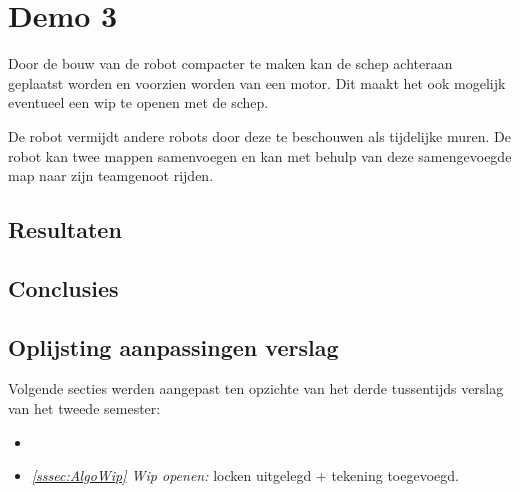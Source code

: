 \documentclass[eind]{penoverslag}
\begin{document}
\section{Demo 3}
\label{Asec:demo3}
Door de bouw van de robot compacter te maken kan de schep achteraan geplaatst worden en voorzien worden van een motor. Dit maakt het ook mogelijk eventueel een wip te openen met de schep.

De robot vermijdt andere robots door deze te beschouwen als tijdelijke muren. De robot kan twee mappen samenvoegen en kan met behulp van deze samengevoegde map naar zijn teamgenoot rijden.

\subsection{Resultaten}
\label{Assec:result3}

\subsection{Conclusies}
\label{Assec:conc3}

\subsection{Oplijsting aanpassingen verslag}
\label{Assec:aanp3}
Volgende secties werden aangepast ten opzichte van het derde tussentijds verslag van het tweede semester:

\begin{itemize}
\item
\item \textit{\ref{sssec:AlgoWip} Wip openen:} locken uitgelegd + tekening toegevoegd. 
\end{itemize}
\end{document}
